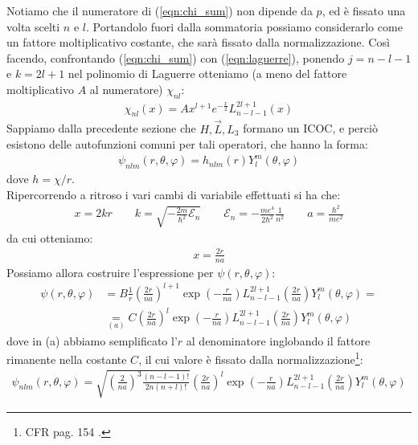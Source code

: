 \documentclass[../../FisicaTeorica.tex]{subfiles}
\begin{document}
Notiamo che il numeratore di (\ref{eqn:chi_sum}) non dipende da $p$, ed è fissato una volta scelti $n$ e $l$. Portandolo fuori dalla sommatoria possiamo considerarlo come un fattore moltiplicativo costante, che sarà fissato dalla normalizzazione. Così facendo, confrontando (\ref{eqn:chi_sum}) con (\ref{eqn:laguerre}), ponendo $j=n-l-1$ e $k = 2l+1$ nel polinomio di Laguerre otteniamo (a meno del fattore moltiplicativo $A$ al numeratore) $\chi_{nl}$:
\begin{align*}
\chi_{nl}(x) = A x^{l+1} e^{-\frac{x}{2}} L^{2l+1}_{n-l-1}(x)
\end{align*} 
Sappiamo dalla precedente sezione che $H, \vec{L}, L_3$ formano un ICOC, e perciò esistono delle autofunzioni comuni per tali operatori, che hanno la forma:
\begin{align*}
\psi_{nlm}(r,\theta,\varphi) = h_{nlm}(r) Y^m_l(\theta,\varphi)
\end{align*}
dove $h=\chi/r$.\\
Ripercorrendo a ritroso i vari cambi di variabile effettuati si ha che:
\begin{align*}
x = 2kr \qquad k = \sqrt{-\frac{2m}{\hbar^2}\mathcal{E}_n} \qquad \mathcal{E}_n = -\frac{me^4}{2\hbar^2}\frac{1}{n^2}\qquad a =\frac{\hbar^2}{me^2}
\end{align*}
da cui otteniamo:
\begin{align*}
x = \frac{2r}{na}
\end{align*}
Possiamo allora costruire l'espressione per $\psi(r,\theta,\varphi)$:
\begin{align*}
\psi(r,\theta,\varphi) &= B\frac{1}{r}\left(\frac{2r}{na}\right)^{l+1}\exp\left(-\frac{r}{na}\right)L^{2l+1}_{n-l-1}\left(\frac{2r}{na}\right)Y^m_l(\theta,\varphi)=\\
&\underset{(a)}{=}C\left(\frac{2r}{na}\right)^l\exp\left(-\frac{r}{na}\right)L^{2l+1}_{n-l-1}\left(\frac{2r}{na}\right)Y^m_l(\theta,\varphi)
\end{align*}
dove in (a) abbiamo semplificato l'$r$ al denominatore inglobando il fattore rimanente nella costante $C$, il cui valore è fissato dalla normalizzazione\footnote{CFR pag. 154 \cite{griffiths}.}:
\begin{align}
\psi_{nlm} (r,\theta,\varphi) = 
\sqrt{\left(\frac{2}{na}\right)^3 \frac{(n-l-1)!}{2n(n+l)!}}\left( \frac{2r}{na}\right)^l\exp\left(-\frac{r}{na}\right) L^{2l+1}_{n-l-1}\left(\frac{2r}{na}\right) Y^m_l(\theta,\varphi)
\label{eqn:autostati_idrogeno_normalizzati}
\end{align}
\end{document}
